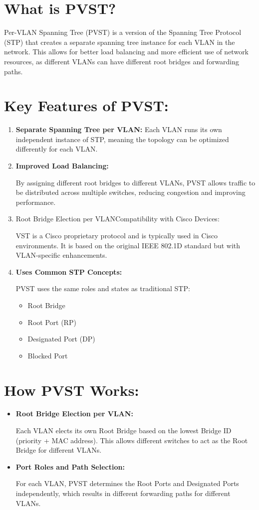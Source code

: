 \documentclass[a4paper]{book}
\begin{document}
\section*{What is PVST?}
Per-VLAN Spanning Tree (PVST) is a version of the Spanning Tree Protocol (STP) that creates a separate spanning tree instance for each VLAN in the network. This allows for better load balancing and more efficient use of network resources, as different VLANs can have different root bridges and forwarding paths.


\section*{Key Features of PVST:}
\begin{enumerate}
    \item \textbf{Separate Spanning Tree per VLAN:}
    \newline
    Each VLAN runs its own independent instance of STP, meaning the topology can be optimized differently for each VLAN.
    \item \textbf{Improved Load Balancing:}
    
    By assigning different root bridges to different VLANs, PVST allows traffic to be distributed across multiple switches, reducing congestion and improving performance.
    
    \item Root Bridge Election per VLANCompatibility with Cisco Devices:
    
    VST is a Cisco proprietary protocol and is typically used in Cisco environments. It is based on the original IEEE 802.1D standard but with VLAN-specific enhancements.
    \item \textbf{Uses Common STP Concepts:}
    
    PVST uses the same roles and states as traditional STP:
    \begin{itemize}
        \item Root Bridge
        \item Root Port (RP)
        \item Designated Port (DP)
        \item Blocked Port
    \end{itemize}
\end{enumerate}

\section*{How PVST Works:}
\begin{itemize}
    \item \textbf{Root Bridge Election per VLAN:}
    
    Each VLAN elects its own Root Bridge based on the lowest Bridge ID (priority + MAC address). This allows different switches to act as the Root Bridge for different VLANs.

    \item \textbf{Port Roles and Path Selection:}
    
    For each VLAN, PVST determines the Root Ports and Designated Ports independently, which results in different forwarding paths for different VLANs.
\end{itemize}
\end{document}
